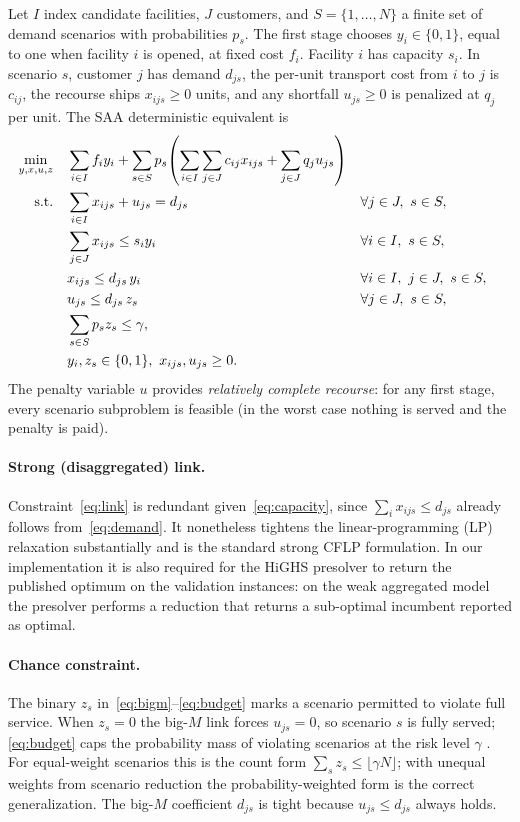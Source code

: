 \documentclass[11pt]{article}
\begin{document}
Let $I$ index candidate facilities, $J$ customers, and $S=\{1,\dots,N\}$ a finite
set of demand scenarios with probabilities $p_s$. The first stage chooses
$y_i\in\{0,1\}$, equal to one when facility $i$ is opened, at fixed cost $f_i$.
Facility $i$ has capacity $s_i$. In scenario $s$, customer $j$ has demand
$d_{js}$, the per-unit transport cost from $i$ to $j$ is $c_{ij}$, the recourse
ships $x_{ijs}\ge 0$ units, and any shortfall $u_{js}\ge 0$ is penalized at
$q_j$ per unit. The SAA deterministic equivalent is
\begin{align}
  \min_{y,x,u,z}\quad & \sum_{i\in I} f_i y_i
    + \sum_{s\in S} p_s\!\left( \sum_{i\in I}\sum_{j\in J} c_{ij} x_{ijs}
      + \sum_{j\in J} q_j u_{js} \right) \label{eq:obj}\\
  \text{s.t.}\quad
  & \sum_{i\in I} x_{ijs} + u_{js} = d_{js} && \forall j\in J,\ s\in S, \label{eq:demand}\\
  & \sum_{j\in J} x_{ijs} \le s_i y_i && \forall i\in I,\ s\in S, \label{eq:capacity}\\
  & x_{ijs} \le d_{js}\, y_i && \forall i\in I,\ j\in J,\ s\in S, \label{eq:link}\\
  & u_{js} \le d_{js}\, z_s && \forall j\in J,\ s\in S, \label{eq:bigm}\\
  & \sum_{s\in S} p_s z_s \le \gamma, \label{eq:budget}\\
  & y_i,z_s\in\{0,1\},\ x_{ijs},u_{js}\ge 0. \notag
\end{align}
The penalty variable $u$ provides \emph{relatively complete recourse}: for any
first stage, every scenario subproblem is feasible (in the worst case nothing is
served and the penalty is paid).

\paragraph{Strong (disaggregated) link.}
Constraint~\eqref{eq:link} is redundant given~\eqref{eq:capacity}, since
$\sum_i x_{ijs}\le d_{js}$ already follows from~\eqref{eq:demand}. It nonetheless
tightens the linear-programming (LP) relaxation substantially and is the standard
strong CFLP formulation. In our implementation it is also required for the HiGHS
presolver to return the published optimum on the validation instances: on the weak
aggregated model the presolver performs a reduction that returns a sub-optimal
incumbent reported as optimal.

\paragraph{Chance constraint.}
The binary $z_s$ in~\eqref{eq:bigm}--\eqref{eq:budget} marks a scenario permitted
to violate full service. When $z_s=0$ the big-$M$ link forces $u_{js}=0$, so
scenario $s$ is fully served; \eqref{eq:budget} caps the probability mass of
violating scenarios at the risk level $\gamma$ \citep{luedtke2008,pagnoncelli2009}.
For equal-weight scenarios this is the count form
$\sum_s z_s \le \lfloor \gamma N\rfloor$; with unequal weights from scenario
reduction the probability-weighted form is the correct generalization. The big-$M$
coefficient $d_{js}$ is tight because $u_{js}\le d_{js}$ always holds.
\end{document}
